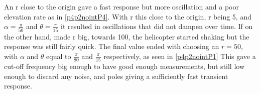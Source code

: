 \newline\newline
An r close to the origin gave a fast response but more oscillation and a poor elevation rate as in \cref{p4p2nointP4}. With r this close to the origin, r being 5, and $\alpha = \frac{\pi}{50}$ and $\theta = \frac{\pi}{15}$ it resulted in oscillations that did not dampen over time. If on the other hand, made r big, towards 100, the helicopter started shaking but the response was still fairly quick. The final value ended with choosing an $r = 50$, with $\alpha$ and $\theta$ equal to $\frac{\pi}{80}$ and $\frac{\pi}{15}$ respectively, as seen in \cref{p4p2nointP1}  This gave a cut-off frequency big enough to have good enough measurements, but still low enough to discard any noise, and poles giving a sufficiently fast transient response.

